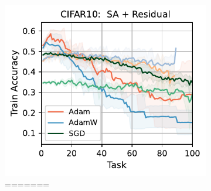 \begin{figure}[htb!]
{\begin{figure}[t]
{    \includegraphics[width=\textwidth]{figs/Accuracy/image/attention_residual/cifar10_40.pdf}
    =======
    }
\end{figure}}
\end{figure}
